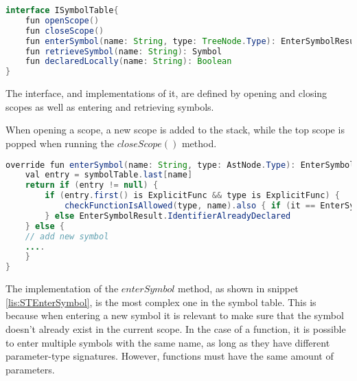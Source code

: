 \begin{lstlisting}[language=java,label=lis:STInterface,caption=The interface which all symbol table implementations must implement.]
interface ISymbolTable{
	fun openScope()
	fun closeScope()
	fun enterSymbol(name: String, type: TreeNode.Type): EnterSymbolResult
	fun retrieveSymbol(name: String): Symbol
	fun declaredLocally(name: String): Boolean
}
\end{lstlisting}
The interface, and implementations of it, are defined by opening and closing scopes as well as entering and retrieving symbols.

When opening a scope, a new scope is added to the stack, while the top scope is popped when running the $closeScope()$ method.

\begin{lstlisting}[language=java,label=lis:STEnterSymbol,caption=A simplified version of the enterSymbol implementation.]
override fun enterSymbol(name: String, type: AstNode.Type): EnterSymbolResult {
	val entry = symbolTable.last[name]
	return if (entry != null) {
		if (entry.first() is ExplicitFunc && type is ExplicitFunc) {
			checkFunctionIsAllowed(type, name).also { if (it == EnterSymbolResult.Success) entry.add(type) }
		} else EnterSymbolResult.IdentifierAlreadyDeclared
	} else {
	// add new symbol
	....
	}
}
\end{lstlisting}

The implementation of the $enterSymbol$ method, as shown in snippet \ref{lis:STEnterSymbol}, is the most complex one in the symbol table. 
This is because when entering a new symbol it is relevant to make sure that the symbol doesn't already exist in the current scope.
In the case of a function, it is possible to enter multiple symbols with the same name, as long as they have different parameter-type signatures. 
However, functions must have the same amount of parameters.
